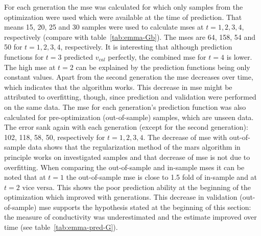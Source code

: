For each generation the \gls{mse} was calculated for which only samples 
from the optimization were used which were available at the time of prediction. 
That means 15, 20, 25 and 30 samples 
were used to calculate \gls{mse}s at $t=1,2,3,4$, respectively (compare with table~\ref{tab:emma-Gb}).
The \gls{mse}s are 64, 158, 54 and 50 for $t=1,2,3,4$, respectively. 
It is interesting that although prediction functions for $t=3$ predicted $v_{cal}$ perfectly, the combined \gls{mse} for $t=4$ is lower. 
The high \gls{mse} at $t=2$ can be explained by the prediction functions being only constant values. 
Apart from the second generation the \gls{mse} decreases  over time, 
which indicates that the algorithm works. 
This decrease in \gls{mse} might be attributed to overfitting, though, since prediction and validation were performed on the same data. 
The \gls{mse} for each generation's prediction function was also calculated for pre-optimization (out-of-sample) samples, which are unseen data. 
The error sank again with each generation (except for the second generation): 102, 118, 58, 50, respectively for $t=1,2,3,4$. 
The decrease of \gls{mse} with out-of-sample data shows that the regularization method 
of the \gls{mars} algorithm in principle works on investigated samples and that decrease of \gls{mse} is not due to overfitting. 
%
When comparing the out-of-sample and in-sample \gls{mse}s it can be noted that at $t=1$ the out-of-sample \gls{mse} is close to 1.5 fold of in-sample and at $t=2$ vice versa.
This shows the poor prediction ability at the beginning of the optimization which improved with generations.
This decrease in validation (out-of-sample) \gls{mse} supports the hypothesis stated at the beginning of this section: 
the measure of conductivity was underestimated and the estimate improved over time (see table~\ref{tab:emma-pred-G}).

